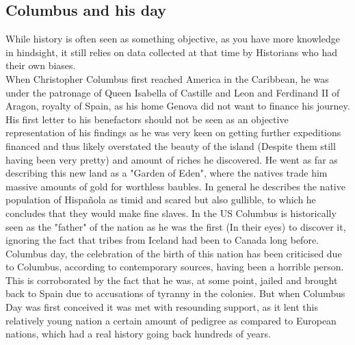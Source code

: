 \documentclass{article}
\begin{document}
	\subsection{Columbus and his day}
	While history is often seen as something objective, as you have more knowledge in hindsight, it still relies on data collected at that time by Historians who had their own biases. \\
	When Christopher Columbus first reached America in the Caribbean, he was under the patronage of Queen Isabella of Castille and Leon and Ferdinand II of Aragon, royalty of Spain, as his home Genova did not want to finance his journey. \\
	His first letter to his benefactors should not be seen as an objective representation of his findings as he was very keen on getting further expeditions financed and thus likely overstated the beauty of the island (Despite them still having been very pretty) and amount of riches he discovered. He went as far as describing this new land as a "Garden of Eden", where the natives trade him massive amounts of gold for worthless baubles. In general he describes the native population of Hispañola as timid and scared but also gullible, to which he concludes that they would make fine slaves. In the US Columbus is historically seen as the "father" of the nation as he was the first (In their eyes) to discover it, ignoring the fact that tribes from Iceland had been to Canada long before. Columbus day, the celebration of the birth of this nation has been criticised due to Columbus, according to contemporary sources, having been a horrible person. This is corroborated by the fact that he was, at some point, jailed and brought back to Spain due to accusations of tyranny in the colonies. But when Columbus Day was first conceived it was met with resounding support, as it lent this relatively young nation a certain amount of pedigree as compared to European nations, which had a real history going back hundreds of years. \\
	
	\newpage
\end{document}
